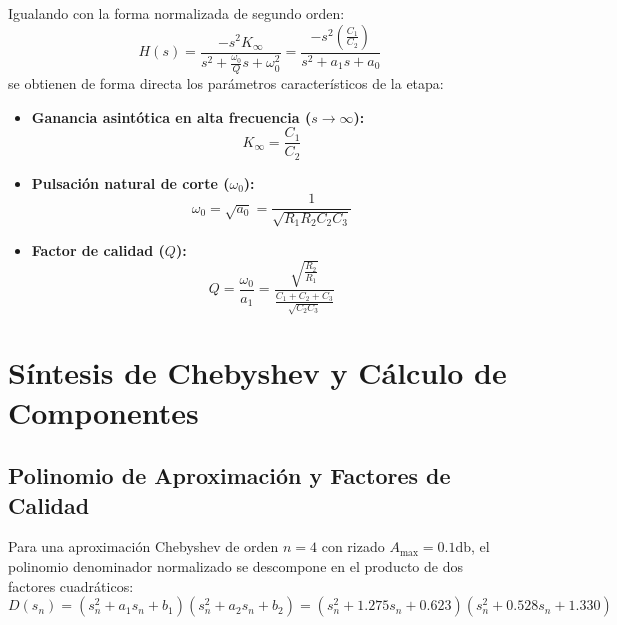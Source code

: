 Igualando con la forma normalizada de segundo orden:
\begin{equation}
    H(s) = \frac{- s^2 K_\infty}{s^2 + \frac{\omega_0}{Q} s + \omega_0^2} = \frac{- s^2 \left( \frac{C_1}{C_2} \right)}{s^2 + a_1 s + a_0}
\end{equation}
se obtienen de forma directa los parámetros característicos de la etapa:
\begin{itemize}
    \item \textbf{Ganancia asintótica en alta frecuencia ($s \to \infty$):}
        \begin{equation}
            K_\infty = \frac{C_1}{C_2}
        \end{equation}
    \item \textbf{Pulsación natural de corte ($\omega_0$):}
        \begin{equation}
            \omega_0 = \sqrt{a_0} = \frac{1}{\sqrt{R_1 R_2 C_2 C_3}}
        \end{equation}
    \item \textbf{Factor de calidad ($Q$):}
        \begin{equation}
            Q = \frac{\omega_0}{a_1} = \frac{\sqrt{\frac{R_2}{R_1}}}{\frac{C_1 + C_2 + C_3}{\sqrt{C_2 C_3}}}
        \end{equation}
\end{itemize}

\section{Síntesis de Chebyshev y Cálculo de Componentes}

\subsection{Polinomio de Aproximación y Factores de Calidad}
Para una aproximación Chebyshev de orden $n = 4$ con rizado $A_{\max} = 0.1 \unit{\decibel}$, el polinomio denominador
normalizado se descompone en el producto de dos factores cuadráticos:
\begin{equation}
    D(s_n) = (s_n^2 + a_1 s_n + b_1)(s_n^2 + a_2 s_n + b_2) = (s_n^2 + 1.275 s_n + 0.623)(s_n^2 + 0.528 s_n + 1.330)
\end{equation}

